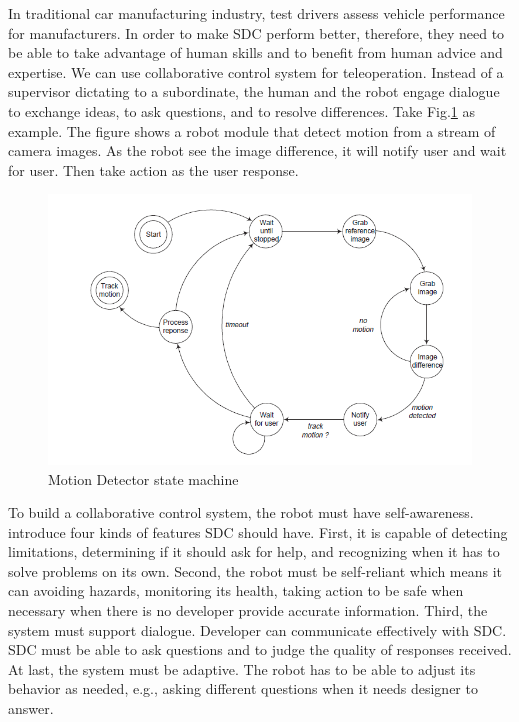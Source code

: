 \documentclass[a4paper, 10pt, conference]{ieeeconf}      %
\begin{document}
In traditional car manufacturing industry, test drivers assess vehicle performance for manufacturers. In order to make SDC perform better, therefore, they need to be able to take advantage of human skills and to benefit from human advice and expertise. We can use collaborative control system for teleoperation. Instead of a supervisor dictating to a subordinate, the human and the robot engage dialogue to exchange ideas, to ask questions, and to resolve differences\cite{c2}. Take Fig.\ref{detector} as example. The figure shows a robot module that detect motion from a stream of camera images. As the robot see the image difference, it will notify user and wait for user. Then take action as the user response.
\begin{figure}
    \centering
    \includegraphics[scale=0.5]{hr-interation.png}
    \caption{Motion Detector state machine\cite{c3}}
    \label{detector}
\end{figure}

To build a collaborative control system, the robot must have self-awareness\cite{c2}. introduce four kinds of features SDC should have. First, it is capable of detecting limitations, determining if it should ask for help, and recognizing when it has to solve problems on its own. Second, the robot must be self-reliant which means it can avoiding hazards, monitoring its health, taking action to be safe when necessary when there is no developer provide accurate information. Third, the system must support dialogue. Developer can communicate effectively with SDC. SDC must be able to ask questions and to judge the quality of responses received. At last, the system must be adaptive. The robot has to be able to adjust its behavior as needed, e.g., asking different questions when it needs designer to answer.
\end{document}
